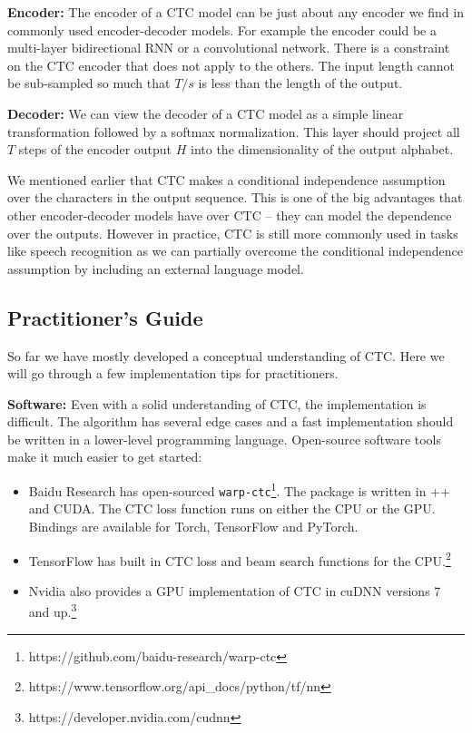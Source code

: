 {\bf Encoder:} The encoder of a CTC model can be just about any encoder we find
in commonly used encoder-decoder models. For example the encoder could be a
multi-layer bidirectional RNN or a convolutional network. There is a constraint
on the CTC encoder that does not apply to the others. The input length cannot
be sub-sampled so much that $T/s$ is less than the length of the output.

{\bf Decoder:} We can view the decoder of a CTC model as a simple linear
transformation followed by a softmax normalization. This layer should project
all $T$ steps of the encoder output $H$ into the dimensionality of the output
alphabet.

We mentioned earlier that CTC makes a conditional independence assumption over
the characters in the output sequence. This is one of the big advantages that
other encoder-decoder models have over CTC -- they can model the dependence
over the outputs. However in practice, CTC is still more commonly used in tasks
like speech recognition as we can partially overcome the conditional
independence assumption by including an external language model.

\subsection{Practitioner's Guide}

So far we have mostly developed a conceptual understanding of CTC. Here we will
go through a few implementation tips for practitioners.

{\bf Software:} Even with a solid understanding of CTC, the implementation is
difficult. The algorithm has several edge cases and a fast implementation
should be written in a lower-level programming language.  Open-source software
tools make it much easier to get started:

\begin{itemize}
\item Baidu Research has open-sourced
    \texttt{warp-ctc}\footnote{https://github.com/baidu-research/warp-ctc}. The
    package is written in \C++ and CUDA. The CTC loss function runs on
    either the CPU or the GPU. Bindings are available for Torch, TensorFlow
    and PyTorch.
\item TensorFlow has built in CTC loss and beam search functions for the
    CPU.\footnote{https://www.tensorflow.org/api\_docs/python/tf/nn}
\item Nvidia also provides a GPU implementation of CTC in cuDNN versions 7 and
    up.\footnote{https://developer.nvidia.com/cudnn}
\end{itemize}

